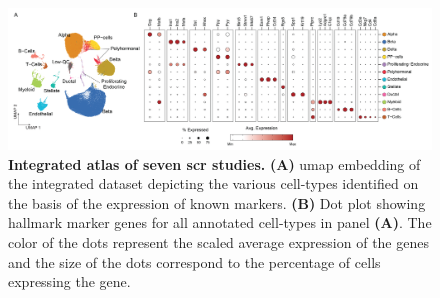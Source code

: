 




\begin{figure}[b!]
\centering
\includegraphics[width=\linewidth]{Chapter5/Fig/F3-2-v2-01.png}
\caption[Integrated atlas of seven  studies]{\textbf{Integrated atlas of seven \gls{scr} studies.} \textbf{(A)} \gls{umap} embedding of the integrated dataset depicting 
 the various cell-types identified on the basis of the expression of known markers. \textbf{(B)} Dot plot showing hallmark marker genes for all annotated cell-types in panel \textbf{(A)}. The color of the dots represent the scaled average expression of the genes and the size of the dots correspond to the percentage of cells expressing the gene.}
\label{fig:chp3_fulldata}
\end{figure}

